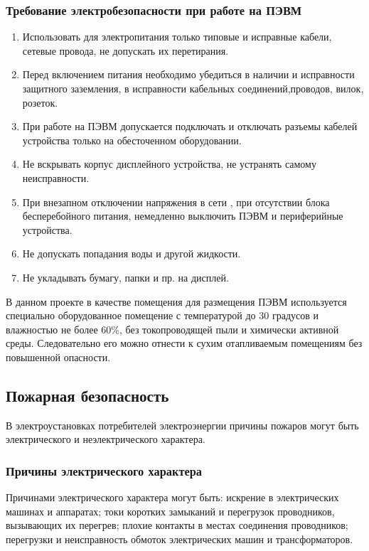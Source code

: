 \subsubsection{Требование электробезопасности при работе на ПЭВМ}
\begin{enumerate}
	\item{} Использовать для электропитания только типовые и исправные кабели,
   сетевые провода, не допускать их перетирания.
	\item{} Перед включением питания необходимо убедиться в наличии и исправности
   защитного заземления, в исправности кабельных соединений,проводов,
   вилок, розеток.
	\item{} При работе на ПЭВМ допускается подключать и отключать разъемы 
    кабелей устройства только на обесточенном оборудовании.
	\item{} Не вскрывать корпус дисплейного устройства, не устранять самому
    неисправности.
	\item{} При внезапном отключении напряжения в сети , при отсутствии блока 
   бесперебойного питания, немедленно выключить ПЭВМ и периферийные
   устройства.
	\item{} Не допускать попадания воды и другой жидкости.
	\item{} Не укладывать бумагу, папки и пр. на дисплей.
\end{enumerate}


В данном проекте  в качестве помещения для размещения ПЭВМ используется 
специально оборудованное помещение с температурой до 30 градусов и 
влажностью не более 60\%, без токопроводящей пыли и химически
 активной среды. Следовательно его можно отнести к сухим отапливаемым помещениям без
повышенной опасности.


\subsection{Пожарная безопасность}
В электроустановках потребителей электроэнергии причины пожаров могут
быть электрического и неэлектрического характера.


\subsubsection{Причины электрического характера}
Причинами электрического характера могут быть: искрение в электрических
машинах и аппаратах; токи коротких замыканий и перегрузок проводников,
вызывающих их перегрев; плохие контакты в местах соединения проводников;
перегрузки и неисправность обмоток электрических машин и трансформаторов.


